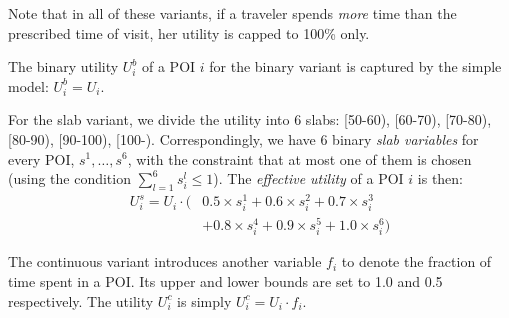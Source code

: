 Note that in all of these variants, if a traveler spends \emph{more} time
than the prescribed time of visit, her utility is capped to 100\% only.

The binary utility $U^b_i$ of a POI $i$ for the binary variant is captured
by the simple model: $U^b_i = U_i$.

For the slab variant, we divide the utility into 6 slabs: [50-60), [60-70),
[70-80), [80-90), [90-100), [100-).  Correspondingly, we have 6 binary \emph{slab
variables} for every POI, $s^1, \dots, s^6$, with the constraint that at
most one of them is chosen (using the condition $\sum_{l=1}^6 s^l_i \leq 1$).  The \emph{effective
utility} of a POI $i$ is then:
%
\begin{align}
	\label{eq:slab}
	U^s_i = U_i \cdot ( & 0.5 \times s^1_i + 0.6 \times s^2_i + 0.7 \times s^3_i \nonumber \\
		& + 0.8 \times s^4_i + 0.9 \times s^5_i + 1.0 \times s^6_i )
\end{align}
%

The continuous variant introduces another variable $f_i$ to denote the fraction of time spent in a POI.
Its upper and lower bounds are set to 1.0 and 0.5 respectively.
The utility $U^c_i$ is simply $U^c_i = U_i \cdot f_i$.

